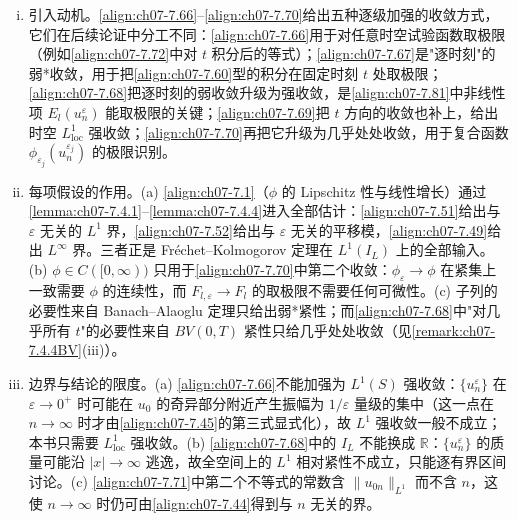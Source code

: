 ﻿\documentclass[../../main.tex]{subfiles}%
\begin{document}
\begin{remark}\label{remark:ch07-7.4.5紧性}
\begin{enumerate}[(i)]
\item 引入动机。\eqref{align:ch07-7.66}--\eqref{align:ch07-7.70}给出五种逐级加强的收敛方式，它们在后续论证中分工不同：\eqref{align:ch07-7.66}用于对任意时空试验函数取极限（例如\eqref{align:ch07-7.72}中对 $t$ 积分后的等式）；\eqref{align:ch07-7.67}是"逐时刻"的弱*收敛，用于把\eqref{align:ch07-7.60}型的积分在固定时刻 $t$ 处取极限；\eqref{align:ch07-7.68}把逐时刻的弱收敛升级为强收敛，是\eqref{align:ch07-7.81}中非线性项 $E_l(u_n^{\varepsilon})$ 能取极限的关键；\eqref{align:ch07-7.69}把 $t$ 方向的收敛也补上，给出时空 $L^1_{\mathrm{loc}}$ 强收敛；\eqref{align:ch07-7.70}再把它升级为几乎处处收敛，用于复合函数 $\phi_{\varepsilon_j}(u_n^{\varepsilon_j})$ 的极限识别。
\item 每项假设的作用。(a) \eqref{align:ch07-7.1}（$\phi$ 的 Lipschitz 性与线性增长）通过\cref{lemma:ch07-7.4.1}--\cref{lemma:ch07-7.4.4}进入全部估计：\eqref{align:ch07-7.51}给出与 $\varepsilon$ 无关的 $L^1$ 界，\eqref{align:ch07-7.52}给出与 $\varepsilon$ 无关的平移模，\eqref{align:ch07-7.49}给出 $L^\infty$ 界。三者正是 Fréchet--Kolmogorov 定理在 $L^1(I_L)$ 上的全部输入。(b) $\phi\in C([0,\infty))$ 只用于\eqref{align:ch07-7.70}中第二个收敛：$\phi_\varepsilon\to\phi$ 在紧集上一致需要 $\phi$ 的连续性，而 $F_{l,\varepsilon}\to F_l$ 的取极限不需要任何可微性。(c) 子列的必要性来自 Banach--Alaoglu 定理只给出弱*紧性；而\eqref{align:ch07-7.68}中"对几乎所有 $t$"的必要性来自 $BV(0,T)$ 紧性只给几乎处处收敛（见\cref{remark:ch07-7.4.4BV}(iii)）。
\item 边界与结论的限度。(a) \eqref{align:ch07-7.66}不能加强为 $L^1(S)$ 强收敛：$\{u_n^\varepsilon\}$ 在 $\varepsilon\to0^+$ 时可能在 $u_0$ 的奇异部分附近产生振幅为 $1/\varepsilon$ 量级的集中（这一点在 $n\to\infty$ 时才由\eqref{align:ch07-7.45}的第三式显式化），故 $L^1$ 强收敛一般不成立；本书只需要 $L^1_{\mathrm{loc}}$ 强收敛。(b) \eqref{align:ch07-7.68}中的 $I_L$ 不能换成 $\mathbb{R}$：$\{u_n^{\varepsilon}\}$ 的质量可能沿 $|x|\to\infty$ 逃逸，故全空间上的 $L^1$ 相对紧性不成立，只能逐有界区间讨论。(c) \eqref{align:ch07-7.71}中第二个不等式的常数含 $\|u_{0n}\|_{L^1}$ 而不含 $n$，这使 $n\to\infty$ 时仍可由\eqref{align:ch07-7.44}得到与 $n$ 无关的界。
\end{enumerate}
\end{remark}
\end{document}
